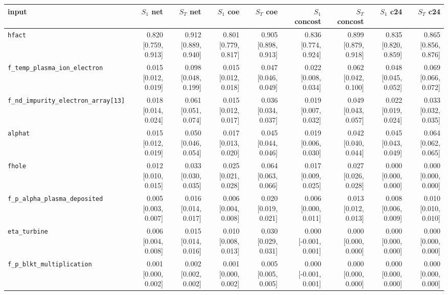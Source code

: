 \begin{tabular}{lrrrrrrrr}
\toprule
input & $S_1$ net & $S_T$ net & $S_1$ coe & $S_T$ coe & $S_1$ concost & $S_T$ concost & $S_1$ c24 & $S_T$ c24 \\
\midrule
\texttt{hfact} & 0.820 [0.759, 0.913] & 0.912 [0.889, 0.940] & 0.801 [0.779, 0.817] & 0.905 [0.898, 0.913] & 0.836 [0.774, 0.924] & 0.899 [0.879, 0.918] & 0.835 [0.820, 0.859] & 0.865 [0.856, 0.876] \\
\texttt{f\_temp\_plasma\_ion\_electron} & 0.015 [0.012, 0.019] & 0.098 [0.048, 0.199] & 0.015 [0.012, 0.018] & 0.047 [0.046, 0.049] & 0.022 [0.008, 0.034] & 0.062 [0.042, 0.100] & 0.048 [0.045, 0.052] & 0.069 [0.066, 0.072] \\
\texttt{f\_nd\_impurity\_electron\_array[13]} & 0.018 [0.014, 0.024] & 0.061 [0.051, 0.074] & 0.015 [0.012, 0.017] & 0.036 [0.034, 0.037] & 0.019 [0.007, 0.032] & 0.049 [0.043, 0.057] & 0.022 [0.019, 0.024] & 0.033 [0.032, 0.035] \\
\texttt{alphat} & 0.015 [0.012, 0.019] & 0.050 [0.046, 0.054] & 0.017 [0.013, 0.020] & 0.045 [0.044, 0.046] & 0.019 [0.006, 0.030] & 0.042 [0.040, 0.044] & 0.045 [0.043, 0.049] & 0.064 [0.062, 0.065] \\
\texttt{fhole} & 0.012 [0.010, 0.015] & 0.033 [0.030, 0.035] & 0.025 [0.021, 0.028] & 0.064 [0.063, 0.066] & 0.017 [0.009, 0.025] & 0.027 [0.026, 0.028] & 0.000 [0.000, 0.000] & 0.000 [0.000, 0.000] \\
\texttt{f\_p\_alpha\_plasma\_deposited} & 0.005 [0.003, 0.007] & 0.016 [0.014, 0.017] & 0.006 [0.004, 0.008] & 0.020 [0.019, 0.021] & 0.006 [0.000, 0.011] & 0.013 [0.012, 0.013] & 0.008 [0.006, 0.009] & 0.010 [0.010, 0.010] \\
\texttt{eta\_turbine} & 0.006 [0.004, 0.008] & 0.015 [0.014, 0.016] & 0.010 [0.008, 0.013] & 0.030 [0.029, 0.031] & 0.000 [-0.001, 0.001] & 0.000 [0.000, 0.000] & 0.000 [0.000, 0.000] & 0.000 [0.000, 0.000] \\
\texttt{f\_p\_blkt\_multiplication} & 0.001 [0.000, 0.002] & 0.002 [0.002, 0.002] & 0.001 [0.000, 0.002] & 0.005 [0.005, 0.005] & 0.000 [-0.001, 0.001] & 0.000 [0.000, 0.000] & 0.000 [0.000, 0.000] & 0.000 [0.000, 0.000] \\

\end{tabular}
